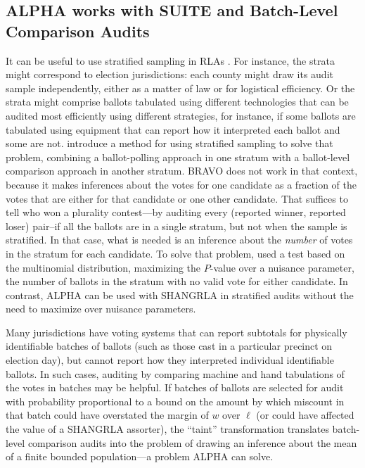 \documentclass[12pt,runningheads]{llncs}
\begin{document}
{\subsection{ALPHA works with SUITE and Batch-Level Comparison Audits}
It can be useful to use stratified sampling in RLAs \cite{stark08a,higginsEtal11,ottoboniEtal18,stark20}.
For instance, the strata might correspond to election jurisdictions: each county might draw its audit sample independently, 
either as a matter of law or for logistical efficiency.
Or the strata might comprise ballots tabulated using different technologies that can be audited most efficiently
using different strategies, for instance, if some ballots are tabulated using equipment that can report how it
interpreted each ballot and some are not.
\cite{ottoboniEtal18} introduce a method for using stratified sampling to solve that problem, combining a ballot-polling
approach in one stratum with a ballot-level comparison approach in another stratum.
BRAVO does not work in that context, because it makes inferences about the votes for one candidate as a fraction of
the votes that are either for that candidate or one other candidate.
That suffices to tell who won a plurality contest---by auditing every (reported winner, reported loser) pair--if all the ballots are in a single stratum, but not when the sample is stratified.
In that case, what is needed is an inference about the \emph{number} of votes in the stratum for each candidate.
To solve that problem, \cite{ottoboniEtal18} used a test based on the multinomial distribution, maximizing the $P$-value
over a nuisance parameter, the number of ballots in the stratum with no valid vote for either candidate.
In contrast, ALPHA can be used with SHANGRLA in stratified audits without the need to maximize over nuisance
parameters.

Many jurisdictions have voting systems that can report subtotals for physically identifiable batches of ballots (such
as those cast in a particular precinct on election day), but cannot report how they interpreted individual identifiable ballots.
In such cases, auditing by comparing machine and hand tabulations of the votes in batches may be helpful.
If batches of ballots are selected for audit with probability proportional to a bound on the amount by which miscount in that
batch could have overstated the margin of $w$ over $\ell$ (or could have affected the value of a SHANGRLA assorter),
the ``taint'' transformation \cite{stark09b} translates batch-level comparison audits into the problem of drawing an 
inference about the mean of a finite bounded population---a problem ALPHA can solve.


}
\end{document}

